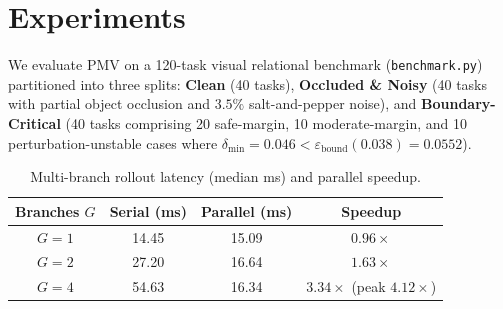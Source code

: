 \documentclass[10pt,twocolumn]{article}
\begin{document}
\section{Experiments}
We evaluate PMV on a 120-task visual relational benchmark (\texttt{benchmark.py}) partitioned into three splits: \textbf{Clean} (40 tasks), \textbf{Occluded \& Noisy} (40 tasks with partial object occlusion and $3.5\%$ salt-and-pepper noise), and \textbf{Boundary-Critical} (40 tasks comprising 20 safe-margin, 10 moderate-margin, and 10 perturbation-unstable cases where $\delta_{\min} = 0.046 < \varepsilon_{\text{bound}}(0.038) = 0.0552$).

\begin{table}[t]
\centering
\caption{Ablation study across 120 visual relational tasks. FAR denotes False Acceptance Rate on unstable boundary states (lower is better).}
\label{tab:ablation}
\end{table}

\begin{table}[t]
\centering
\caption{Multi-branch rollout latency (median ms) and parallel speedup.}
\label{tab:scaling}
\begin{tabular}{cccc}
\toprule
\textbf{Branches $G$} & \textbf{Serial (ms)} & \textbf{Parallel (ms)} & \textbf{Speedup} \\
\midrule
$G=1$ & 14.45 & 15.09 & $0.96\times$ \\
$G=2$ & 27.20 & 16.64 & $\mathbf{1.63\times}$ \\
$G=4$ & 54.63 & 16.34 & $\mathbf{3.34\times}$ (peak $4.12\times$) \\
\bottomrule
\end{tabular}
\end{table}
\end{document}
